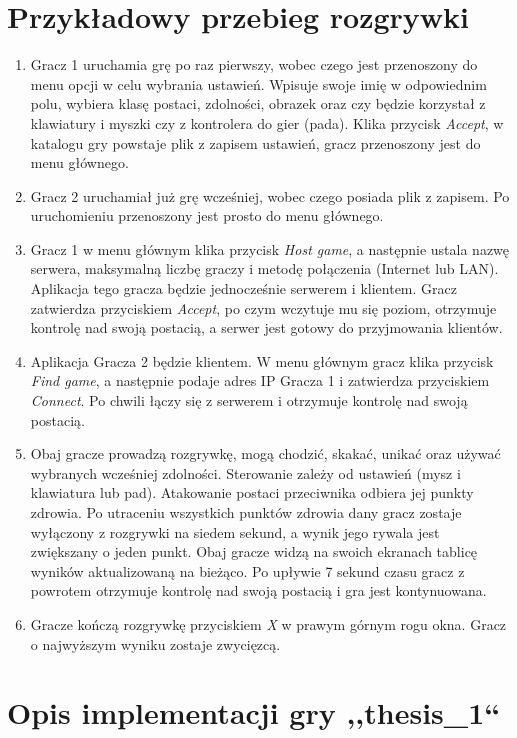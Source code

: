 \documentclass[multip]{SGGW-thesis}
\begin{document}
\chapter{Przykładowy przebieg rozgrywki} %
\begin{enumerate}
	\item Gracz 1 uruchamia grę po raz pierwszy, wobec czego jest przenoszony do menu opcji w celu wybrania ustawień. Wpisuje swoje imię w odpowiednim polu, wybiera klasę postaci, zdolności, obrazek oraz czy będzie korzystał z klawiatury i myszki czy z kontrolera do gier (pada). Klika przycisk {\em Accept}, w katalogu gry powstaje plik z zapisem ustawień, gracz przenoszony jest do menu głównego.
	\item Gracz 2 uruchamiał już grę wcześniej, wobec czego posiada plik z zapisem. Po uruchomieniu przenoszony jest prosto do menu głównego.
	\item Gracz 1 w menu głównym klika przycisk {\em Host game}, a następnie ustala nazwę serwera, maksymalną liczbę graczy i metodę połączenia (Internet lub LAN). Aplikacja tego gracza będzie jednocześnie serwerem i klientem. Gracz zatwierdza przyciskiem {\em Accept}, po czym wczytuje mu się poziom, otrzymuje kontrolę nad swoją postacią, a serwer jest gotowy do przyjmowania klientów.
	\item Aplikacja Gracza 2 będzie klientem. W menu głównym gracz klika przycisk {\em Find game}, a następnie podaje adres IP Gracza 1 i zatwierdza przyciskiem {\em Connect}. Po chwili łączy się z serwerem i otrzymuje kontrolę nad swoją postacią.
	\item Obaj gracze prowadzą rozgrywkę, mogą chodzić, skakać, unikać oraz używać wybranych wcześniej zdolności. Sterowanie zależy od ustawień (mysz i klawiatura lub pad). Atakowanie postaci przeciwnika odbiera jej punkty zdrowia. Po utraceniu wszystkich punktów zdrowia dany gracz zostaje wyłączony z rozgrywki na siedem sekund, a wynik jego rywala jest zwiększany o jeden punkt. Obaj gracze widzą na swoich ekranach tablicę wyników aktualizowaną na bieżąco. Po upływie 7 sekund czasu gracz z powrotem otrzymuje kontrolę nad swoją postacią i gra jest kontynuowana.
	\item Gracze kończą rozgrywkę przyciskiem {\em X} w prawym górnym rogu okna. Gracz o najwyższym wyniku zostaje zwycięzcą.
\end{enumerate}

\chapter{Opis implementacji gry ,,thesis\_1``}
\label{implementacja}
\end{document}
